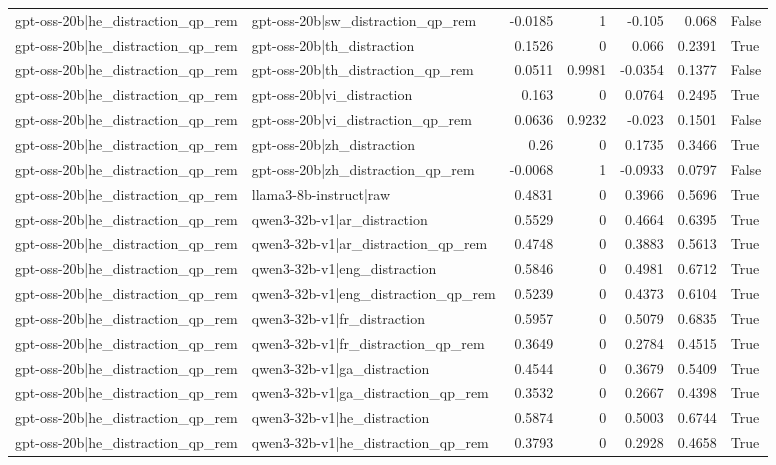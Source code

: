 \begin{table}
\begin{tabular}{l l r r r r l}
gpt-oss-20b|he_distraction_qp_rem & gpt-oss-20b|sw_distraction_qp_rem & -0.0185 & 1 & -0.105 & 0.068 & False \\
gpt-oss-20b|he_distraction_qp_rem & gpt-oss-20b|th_distraction & 0.1526 & 0 & 0.066 & 0.2391 & True \\
gpt-oss-20b|he_distraction_qp_rem & gpt-oss-20b|th_distraction_qp_rem & 0.0511 & 0.9981 & -0.0354 & 0.1377 & False \\
gpt-oss-20b|he_distraction_qp_rem & gpt-oss-20b|vi_distraction & 0.163 & 0 & 0.0764 & 0.2495 & True \\
gpt-oss-20b|he_distraction_qp_rem & gpt-oss-20b|vi_distraction_qp_rem & 0.0636 & 0.9232 & -0.023 & 0.1501 & False \\
gpt-oss-20b|he_distraction_qp_rem & gpt-oss-20b|zh_distraction & 0.26 & 0 & 0.1735 & 0.3466 & True \\
gpt-oss-20b|he_distraction_qp_rem & gpt-oss-20b|zh_distraction_qp_rem & -0.0068 & 1 & -0.0933 & 0.0797 & False \\
gpt-oss-20b|he_distraction_qp_rem & llama3-8b-instruct|raw & 0.4831 & 0 & 0.3966 & 0.5696 & True \\
gpt-oss-20b|he_distraction_qp_rem & qwen3-32b-v1|ar_distraction & 0.5529 & 0 & 0.4664 & 0.6395 & True \\
gpt-oss-20b|he_distraction_qp_rem & qwen3-32b-v1|ar_distraction_qp_rem & 0.4748 & 0 & 0.3883 & 0.5613 & True \\
gpt-oss-20b|he_distraction_qp_rem & qwen3-32b-v1|eng_distraction & 0.5846 & 0 & 0.4981 & 0.6712 & True \\
gpt-oss-20b|he_distraction_qp_rem & qwen3-32b-v1|eng_distraction_qp_rem & 0.5239 & 0 & 0.4373 & 0.6104 & True \\
gpt-oss-20b|he_distraction_qp_rem & qwen3-32b-v1|fr_distraction & 0.5957 & 0 & 0.5079 & 0.6835 & True \\
gpt-oss-20b|he_distraction_qp_rem & qwen3-32b-v1|fr_distraction_qp_rem & 0.3649 & 0 & 0.2784 & 0.4515 & True \\
gpt-oss-20b|he_distraction_qp_rem & qwen3-32b-v1|ga_distraction & 0.4544 & 0 & 0.3679 & 0.5409 & True \\
gpt-oss-20b|he_distraction_qp_rem & qwen3-32b-v1|ga_distraction_qp_rem & 0.3532 & 0 & 0.2667 & 0.4398 & True \\
gpt-oss-20b|he_distraction_qp_rem & qwen3-32b-v1|he_distraction & 0.5874 & 0 & 0.5003 & 0.6744 & True \\
gpt-oss-20b|he_distraction_qp_rem & qwen3-32b-v1|he_distraction_qp_rem & 0.3793 & 0 & 0.2928 & 0.4658 & True \\

\end{tabular}
\end{table}
